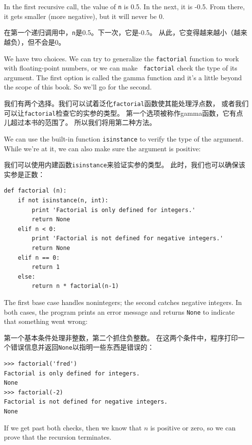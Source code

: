 \documentclass[10pt]{book}
\begin{document}
\begin{CJK}{UTF8}{gbsn}
In the first recursive call, the value of {\tt n} is 0.5.
In the next, it is -0.5.  From there, it gets smaller
(more negative), but it will never be 0.

在第一个递归调用中，{\tt n}是0.5。下一次，它是-0.5。
从此，它变得越来越小（越来越负），但不会是0。

We have two choices.  We can try to generalize the {\tt factorial}
function to work with floating-point numbers, or we can make {\tt
  factorial} check the type of its argument.  The first option is
called the gamma function and it's a
little beyond the scope of this book.  So we'll go for the second.

我们有两个选择。我们可以试着泛化{\tt factorial}函数使其能处理浮点数，
或者我们可以让{\tt factorial}检查它的实参的类型。
第一个选项被称作gamma函数，它有点儿超过本书的范围了。
所以我们将用第二种方法。

We can use the built-in function {\tt isinstance} to verify the type
of the argument.  While we're at it, we can also make sure the
argument is positive:

我们可以使用内建函数{\tt isinstance}来验证实参的类型。
此时，我们也可以确保该实参是正数：

\begin{verbatim}
def factorial (n):
    if not isinstance(n, int):
        print 'Factorial is only defined for integers.'
        return None
    elif n < 0:
        print 'Factorial is not defined for negative integers.'
        return None
    elif n == 0:
        return 1
    else:
        return n * factorial(n-1)
\end{verbatim}
%
The first base case handles nonintegers; the
second catches negative integers.  In both cases, the program prints
an error message and returns {\tt None} to indicate that something
went wrong:

第一个基本条件处理非整数，第二个抓住负整数。
在这两个条件中，程序打印一个错误信息并返回{\tt None}以指明一些东西是错误的：

\begin{verbatim}
>>> factorial('fred')
Factorial is only defined for integers.
None
>>> factorial(-2)
Factorial is not defined for negative integers.
None
\end{verbatim}
% 
If we get past both checks, then we know that $n$ is positive or
zero, so we can prove that the recursion terminates.


\end{CJK}
\end{document}
